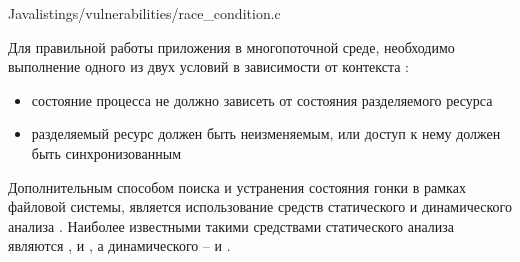 	{Java}{listings/vulnerabilities/race_condition.c}

%
Для правильной работы приложения в многопоточной среде, необходимо выполнение одного из двух 
условий в зависимости от контекста  : 
\begin{itemize}
	\item состояние процесса не должно зависеть от состояния разделяемого ресурса
	\item разделяемый ресурс должен быть неизменяемым, или доступ к нему должен быть 
		синхронизованным 
\end{itemize}

%
Дополнительным способом поиска и устранения состояния гонки в рамках файловой системы, является 
использование средств статического и динамического анализа . 
%
Наиболее известными такими средствами статического анализа являются  , 
  и  , а динамического – 
  и  . 